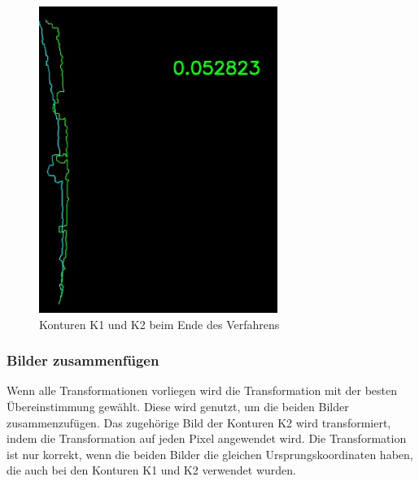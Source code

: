 \begin{figure}[h]
\begin{minipage}{0.24\textwidth}
        \includegraphics[width=\textwidth]{images/stitching_end.PNG} %
        \caption{Konturen K1 und K2 beim Ende des Verfahrens}
        \label{fig:stitching_end}
    \end{minipage}\hfill
\end{figure}

\subsubsection*{Bilder zusammenfügen}

Wenn alle Transformationen vorliegen wird die Transformation mit der besten 
Übereinstimmung gewählt. Diese wird genutzt, um die beiden Bilder zusammenzufügen.
Das zugehörige Bild der Konturen K2 wird transformiert, indem die Transformation 
auf jeden Pixel angewendet wird.  
Die Transformation ist nur korrekt, wenn die beiden Bilder die gleichen 
Ursprungskoordinaten haben, die auch bei den Konturen K1 und K2 verwendet wurden.

